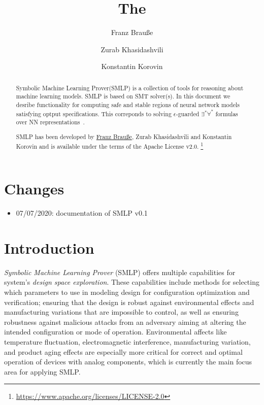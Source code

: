 \documentclass[a4paper,parskip=half]{article} %
\title{The \Solver}
\author{%
	Franz Brauße \and
	Zurab Khasidashvili \and
	Konstantin Korovin
}
\newcommand*\Solver{Symbolic Machine Learning Prover\xspace}
\newcommand*\SolverAbbrvText{SMLP}
\newcommand*\SolverAbbrv{\SolverAbbrvText\xspace}
\begin{document}
\maketitle
\begin{abstract}


\Solver (\SolverAbbrv) is a collection of tools for reasoning about machine
learning models. \SolverAbbrv is based on SMT solver(s). In this document we
desribe functionality for computing safe and stable regions of neural network
models satisfying optput specifications. This correponds to solving
$\epsilon$-guarded $\exists^*\forall^*$ formulas over NN
representations~\cite{BKK20}.


\SolverAbbrv has been developed by
\href{mailto:brausse@informatik.uni-trier.de?subject=\SolverAbbrvText}{Franz Brauße},
Zurab Khasidashvili
and Konstantin Korovin and is available
under the terms of the Apache License v2.0.%
\footnote{\url{https://www.apache.org/licenses/LICENSE-2.0}}
\end{abstract}
\tableofcontents

\section{Changes}
\begin{itemize}
\item 07/07/2020: documentation of \SolverAbbrv v0.1
\end{itemize}

\section{Introduction}

\emph{Symbolic Machine Learning Prover} (SMLP) offers multiple capabilities for system's \emph{design space exploration}.
These capabilities include methods for selecting which parameters to use in modeling design for configuration optimization and verification;
ensuring that the design is robust against environmental effects and manufacturing variations that are impossible to control, as well as ensuring 
robustness against malicious attacks from an adversary aiming at altering the intended configuration or mode of operation.
Environmental affects like temperature fluctuation, electromagnetic interference, manufacturing variation, and product aging effects are especially 
more critical for correct and optimal operation of devices with analog components, which is currently the main focus area for applying  SMLP.
\end{document}
